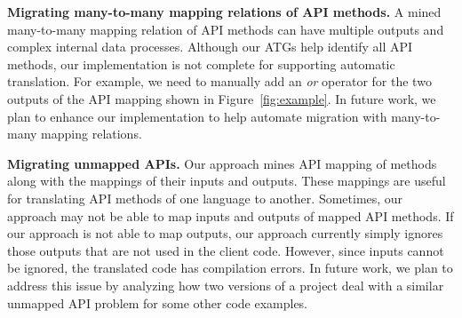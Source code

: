
\textbf{Migrating many-to-many mapping relations of API methods.}
A mined many-to-many mapping relation of API methods can have multiple outputs
and complex internal data processes. Although our ATGs
help identify all API methods, our implementation is not complete
for supporting automatic translation. For example, we need to manually add an
\emph{or} operator for the two outputs of the API mapping shown in
Figure~\ref{fig:example}. In future work, we plan to enhance our implementation to help
automate migration with many-to-many mapping relations.

\textbf{Migrating unmapped APIs.} Our approach mines API mapping of
methods along with the mappings of their inputs and outputs. These
mappings are useful for translating API methods of one language to
another. Sometimes, our approach may not be able to map inputs and
outputs of mapped API methods. If our approach is not able to map
outputs, our approach currently simply ignores those outputs that are not used
in the client code. However, since inputs cannot be ignored, the
translated code has compilation errors. In future work, we
plan to address this issue by analyzing how two versions of a
project deal with a similar unmapped API problem for some other code
examples. 